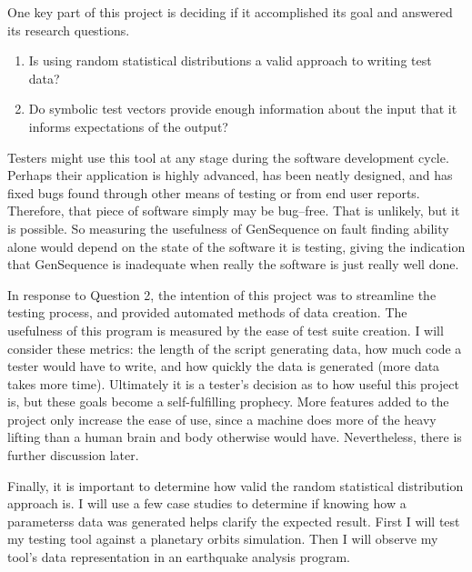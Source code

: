 
One key part of this project is deciding if it accomplished its goal and answered its research questions. 
\begin{enumerate}
\item Is using random statistical distributions a valid approach to writing test data?
\item Do symbolic test vectors provide enough information about the input that it informs expectations of the output?
\end{enumerate}

Testers might use this tool at any stage during the software development cycle. Perhaps their application is highly advanced, has been neatly designed, and has fixed bugs found through other means of testing or from end user reports. Therefore, that piece of software simply may be bug--free. That is unlikely, but it is possible. So measuring the usefulness of GenSequence on fault finding ability alone would depend on the state of the software it is testing, giving the indication that GenSequence is inadequate when really the software is just really well done.

In response to Question 2, the intention of this project was to streamline the testing process, and provided automated methods of data creation. The usefulness of this program is measured by the ease of test suite creation. I will consider these metrics: the length of the script generating data, how much code a tester would have to write, and how quickly the data is generated (more data takes more time). Ultimately it is a tester's decision as to how useful this project is, but these goals become a self-fulfilling prophecy. More features added to the project only increase the ease of use, since a machine does more of the heavy lifting than a human brain and body otherwise would have. Nevertheless, there is further discussion later.

Finally, it is important to determine how valid the random statistical distribution approach is. I will use a few case studies to determine if knowing how a parameterss data was generated helps clarify the expected result. First I will test my testing tool against a planetary orbits simulation. Then I will observe my tool's data representation in an earthquake analysis program. 